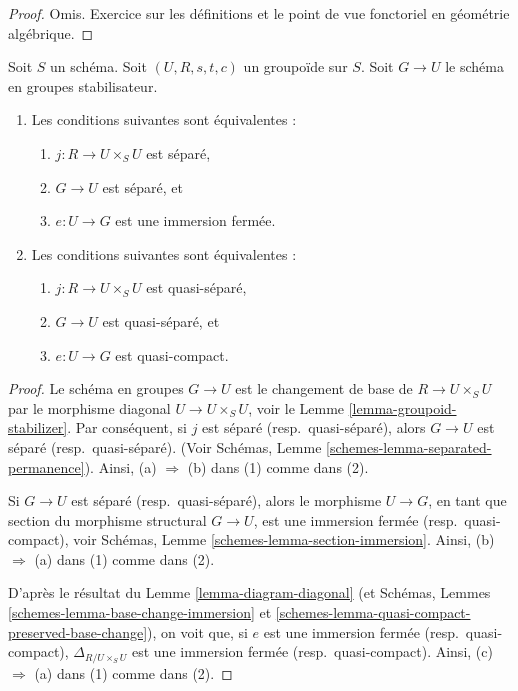 \begin{proof}
Omis.
Exercice sur les définitions et le point de vue fonctoriel en
géométrie algébrique.
\end{proof}

\begin{lemma}
\label{lemma-diagonal}
Soit $S$ un schéma.
Soit $(U, R, s, t, c)$ un groupoïde sur $S$.
Soit $G \to U$ le schéma en groupes stabilisateur.
\begin{enumerate}
\item Les conditions suivantes sont équivalentes :
\begin{enumerate}
\item $j : R \to U \times_S U$ est séparé,
\item $G \to U$ est séparé, et
\item $e : U \to G$ est une immersion fermée.
\end{enumerate}
\item Les conditions suivantes sont équivalentes :
\begin{enumerate}
\item $j : R \to U \times_S U$ est quasi-séparé,
\item $G \to U$ est quasi-séparé, et
\item $e : U \to G$ est quasi-compact.
\end{enumerate}
\end{enumerate}
\end{lemma}

\begin{proof}
Le schéma en groupes $G \to U$ est le changement de base de $R \to U \times_S U$
par le morphisme diagonal $U \to U \times_S U$, voir le
Lemme \ref{lemma-groupoid-stabilizer}. Par conséquent, si
$j$ est séparé (resp.\ quasi-séparé),
alors $G \to U$ est séparé (resp.\ quasi-séparé).
(Voir Schémas, Lemme
\ref{schemes-lemma-separated-permanence}).
Ainsi, (a) $\Rightarrow$ (b) dans (1) comme dans (2).

\medskip\noindent
Si $G \to U$ est séparé (resp.\ quasi-séparé), alors le morphisme
$U \to G$, en tant que section du morphisme structural $G \to U$, est une immersion
fermée (resp.\ quasi-compact), voir
Schémas, Lemme \ref{schemes-lemma-section-immersion}.
Ainsi, (b) $\Rightarrow$ (a) dans (1) comme dans (2).

\medskip\noindent
D'après le résultat du
Lemme \ref{lemma-diagram-diagonal}
(et Schémas, Lemmes \ref{schemes-lemma-base-change-immersion}
et \ref{schemes-lemma-quasi-compact-preserved-base-change}),
on voit que, si $e$ est une immersion fermée (resp.\ quasi-compact),
$\Delta_{R/U \times_S U}$ est une immersion
fermée (resp.\ quasi-compact).
Ainsi, (c) $\Rightarrow$ (a) dans (1) comme dans (2).
\end{proof}









